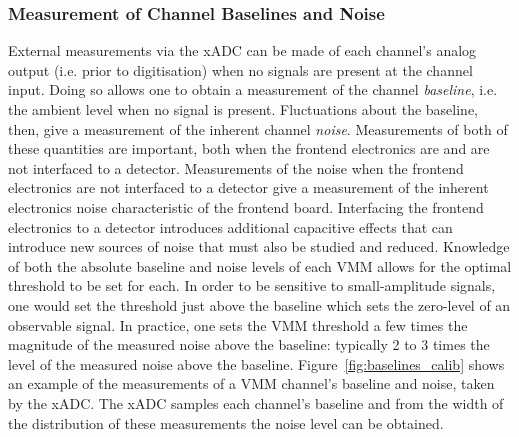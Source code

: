 \subsubsection{Measurement of Channel Baselines and Noise}
\label{sec:calib_baselines}

External measurements via the xADC can be made of each channel's analog output (i.e. prior
to digitisation) when no signals are present at the channel input.
Doing so allows one to obtain a measurement of the channel \textit{baseline}, i.e. the
ambient level when no signal is present.
Fluctuations about the baseline, then, give a measurement of the inherent channel \textit{noise}.
Measurements of both of these quantities are important, both when the frontend electronics
are and are not interfaced to a detector.
Measurements of the noise when the frontend electronics are not interfaced to a detector give
a measurement of the inherent electronics noise characteristic of the frontend board.
Interfacing the frontend electronics to a detector introduces additional capacitive effects
that can introduce new sources of noise that must also be studied and reduced.
Knowledge of both the absolute baseline and noise levels of each VMM allows for the optimal threshold
to be set for each.
In order to be sensitive to small-amplitude signals, one would set the threshold just above the baseline
which sets the zero-level of an observable signal.
In practice, one sets the VMM threshold a few times the magnitude of the measured noise above the baseline: typically
2 to 3 times the level of the measured noise above the baseline.
Figure~\ref{fig:baselines_calib} shows an example of the measurements of a VMM channel's baseline and noise, taken by the xADC.
The xADC samples each channel's baseline and from the width of the distribution of these measurements the noise
level can be obtained.

